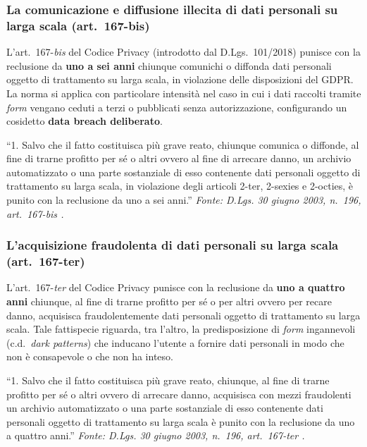 \documentclass[12pt, a4paper]{article}
\begin{document}
\subsubsection{La comunicazione e diffusione illecita di dati personali su larga scala (art.~167-bis)}
\label{subsub:art167bis}

L'art.~167-\emph{bis} del Codice Privacy (introdotto dal D.Lgs.~101/2018)
punisce con la reclusione da \textbf{uno a sei anni} chiunque comunichi o
diffonda dati personali oggetto di trattamento su larga scala, in violazione
delle disposizioni del GDPR. La norma si applica con particolare intensità
nel caso in cui i dati raccolti tramite \emph{form} vengano ceduti a terzi o
pubblicati senza autorizzazione, configurando un cosidetto \textbf{data breach
deliberato}.

\begin{normabox}
  \small
  ``1. Salvo che il fatto costituisca più grave reato, chiunque comunica o diffonde,
  al fine di trarne profitto per sé o altri ovvero al fine di arrecare danno, un
  archivio automatizzato o una parte sostanziale di esso contenente dati personali
  oggetto di trattamento su larga scala, in violazione degli articoli 2-ter, 2-sexies
  e 2-octies, è punito con la reclusione da uno a sei anni.''
  \newline
  {\scriptsize \textit{Fonte: D.Lgs. 30 giugno 2003, n.~196, art.~167-bis
  \autocite{codiceprivacy2003}.}}
\end{normabox}

\subsubsection{L'acquisizione fraudolenta di dati personali su larga scala (art.~167-ter)}
\label{subsub:art167ter}

L'art.~167-\emph{ter} del Codice Privacy punisce con la reclusione da
\textbf{uno a quattro anni} chiunque, al fine di trarne profitto per sé
o per altri ovvero per recare danno, acquisisca fraudolentemente dati
personali oggetto di trattamento su larga scala. Tale fattispecie riguarda,
tra l'altro, la predisposizione di \emph{form} ingannevoli (c.d.\ \emph{dark
patterns}) che inducano l'utente a fornire dati personali in modo che non è
consapevole o che non ha inteso.

\begin{normabox}
  \small
  ``1. Salvo che il fatto costituisca più grave reato, chiunque, al fine di trarne
  profitto per sé o altri ovvero di arrecare danno, acquisisca con mezzi
  fraudolenti un archivio automatizzato o una parte sostanziale di esso contenente
  dati personali oggetto di trattamento su larga scala è punito con la reclusione
  da uno a quattro anni.''
  \newline
  {\scriptsize \textit{Fonte: D.Lgs. 30 giugno 2003, n.~196, art.~167-ter
  \autocite{codiceprivacy2003}.}}
\end{normabox}
\end{document}
